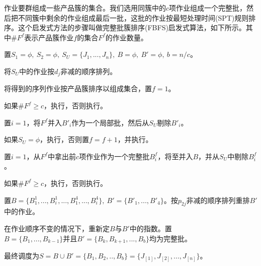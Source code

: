 作业要群组成一些产品簇的集合。我们选用同簇中的$c$项作业组成一个完整批，然后把不同簇中剩余的作业组成最后一批，这批的作业按最短处理时间(SPT)规则排序。这个启发式方法的步骤叫做完整批簇排序(FBFS)启发式算法，如下所示。其中$\# F^f$表示产品簇作业$f$的集合$F^f$的作业数量。
\begin{asparaenum}
\renewcommand{\labelenumi}{\heiti 步骤\theenumi~}
\item 置$S_1 = \phi,\ S_2=\phi,\ S_U = \{J_1,...,J_n\},\ B = \phi,\ B' = \phi,\ b=n/c$。
\item 将$S_U$中的作业按$d_j$非减的顺序排列。
\item 将得到的序列作业按产品簇排序以组成集合，置$f=1$。
\item 如果$\# F^f \geqslant c$，执行，否则执行。
\item 置$i=1$，将$F^f\text{并入}B'_i$作为一个局部批，然后从$S_U\text{剔除}B'_i$。
\item 如果$S_U = \phi$，执行，否则置$f=f+1$，并执行。
\item 置$i=1$，从$F^f$中拿出前$c$项作业作为一个完整批$B^f_i$，将至并入$B$，并从$S_U\text{中剔除}B^f_i$。
\item 如果$\# F^f \geqslant c$，执行，否则执行。
\item 置$B = \{B_1^1,...,B_i^1,...,B_1^4,...,B_i^4\},\ B' = \{B'_1,...,B'_4\}$。按$p_{2j}$非减的顺序排列重排$B'$中的作业。
\item 在作业顺序不变的情况下，重新定$B\text{与}B'$中的指数。置$B=\{B_1,...,B_{k-1}\}\text{并且}B' = \{B_k,B_{k+1},...,B_b\}$均为完整批。
\item 最终调度为$S=B\cup B' = \{B_1,B_2,..,B_b\} = \{J_{[1]},J_{[2]},...,J_{[n]}\}$。
\end{asparaenum}

